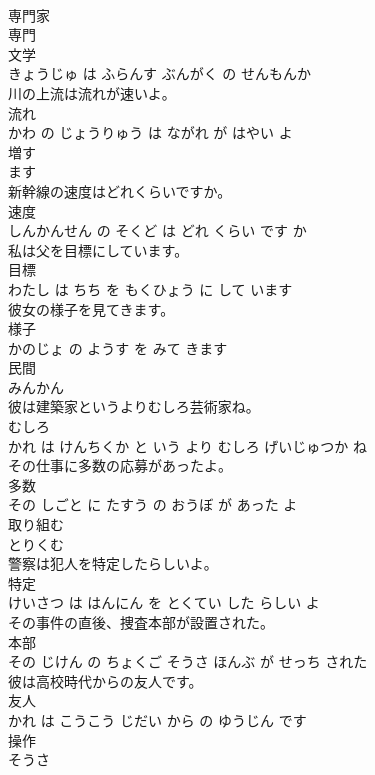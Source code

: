 \documentclass[8pt]{extreport}
\begin{document}
\begin{CJK}{UTF8}{min}
\\	専門家 
\\	専門 
\\	文学 
\\	きょうじゅ は ふらんす ぶんがく の せんもんか			
\\	川の上流は流れが速いよ。	
\\	流れ 
\\	かわ の じょうりゅう は ながれ が はやい よ			
\\	増す	
\\	ます			
\\	新幹線の速度はどれくらいですか。	
\\	速度 
\\	しんかんせん の そくど は どれ くらい です か			
\\	私は父を目標にしています。	
\\	目標 
\\	わたし は ちち を もくひょう に して います			
\\	彼女の様子を見てきます。	
\\	様子 
\\	かのじょ の ようす を みて きます			
\\	民間	
\\	みんかん			
\\	彼は建築家というよりむしろ芸術家ね。	
\\	むしろ 
\\	かれ は けんちくか と いう より むしろ げいじゅつか ね			
\\	その仕事に多数の応募があったよ。	
\\	多数 
\\	その しごと に たすう の おうぼ が あった よ			
\\	取り組む	
\\	とりくむ			
\\	警察は犯人を特定したらしいよ。	
\\	特定 
\\	けいさつ は はんにん を とくてい した らしい よ			
\\	その事件の直後、捜査本部が設置された。	
\\	本部 
\\	その じけん の ちょくご そうさ ほんぶ が せっち された			
\\	彼は高校時代からの友人です。	
\\	友人 
\\	かれ は こうこう じだい から の ゆうじん です			
\\	操作	
\\	そうさ			

\end{CJK}
\end{document}
